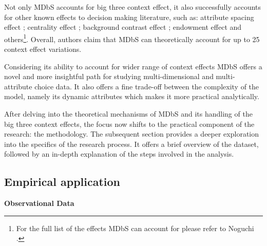 \documentclass[a4paper,12pt]{article}
\newcommand{\citeyearonly}[1]{\citeyearpar{#1}}
\begin{document}
Not only MDbS accounts for big three context effect, it also successfully accounts for other known effects to decision making literature, such as: attribute spacing effect \citep{cooke1998multiattribute}; centrality effect \citep{brown2011decision}; background contrast effect \citep{tverskySimonson93}; endowment effect \citep{knetsch1989endowment} and others\footnote{For the full list of the effects MDbS can account for please refer to Noguchi \citeyearonly{noguchi2018multialternative}.}. Overall, authors claim that MDbS can theoretically account for up to 25 context effect variations. 

Considering its ability to account for wider range of context effects MDbS offers a novel and more insightful path for studying multi-dimensional and multi-attribute choice data. It also offers a fine trade-off between the complexity of the model, namely its dynamic attributes which makes it more practical analytically. 

After delving into the theoretical mechanisms of MDbS and its handling of the big three context effects, the focus now shifts to the practical component of the research: the methodology. The subsequent section provides a deeper exploration into the specifics of the research process. It offers a brief overview of the dataset, followed by an in-depth explanation of the steps involved in the analysis.

\subsection{Empirical application}

\textbf{Observational Data}\label{section:observationalDataDescription}
\end{document}
